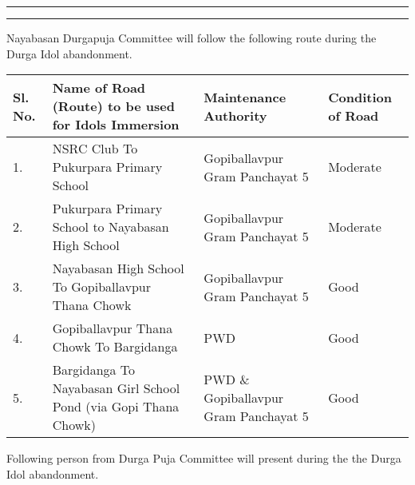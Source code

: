 
\begin{center}
	\myheader
\end{center}

\hrule \vspace*{2pt} \hrule  \vspace*{20pt}
\begin{adjustwidth}{15mm}{15mm}\large 
	\begin{center} 
		
	\end{center}\large
	Nayabasan Durgapuja Committee will follow the following route during the Durga Idol abandonment. \\
	\begin{center} 
		\scalebox{0.85}
		{\begin{tabular}{|p{1cm}|p{7cm}|p{5cm}|p{3cm}|}
				\hline 
				Sl. No. & Name of Road (Route) to be used for Idols Immersion & Maintenance Authority & Condition of Road \\ 
				\hline \hline 
				1.& NSRC Club To Pukurpara Primary School & Gopiballavpur Gram Panchayat  5  & Moderate \\ 
				\hline 
				2. & Pukurpara Primary School to Nayabasan High School & Gopiballavpur Gram Panchayat  5  & Moderate \\\hline 
				3. & Nayabasan High School To Gopiballavpur Thana Chowk & Gopiballavpur Gram Panchayat  5  & Good \\\hline
				4. & Gopiballavpur Thana Chowk To Bargidanga & PWD  & Good \\\hline
				5. & Bargidanga To Nayabasan Girl School Pond (via Gopi Thana Chowk)  & PWD \& Gopiballavpur Gram Panchayat  5   & Good \\\hline 
		\end{tabular} }
	\end{center}
	\vspace*{1cm}
	
	Following person from Durga Puja Committee will present  during the  the Durga Idol abandonment. \\
	

\end{adjustwidth}
